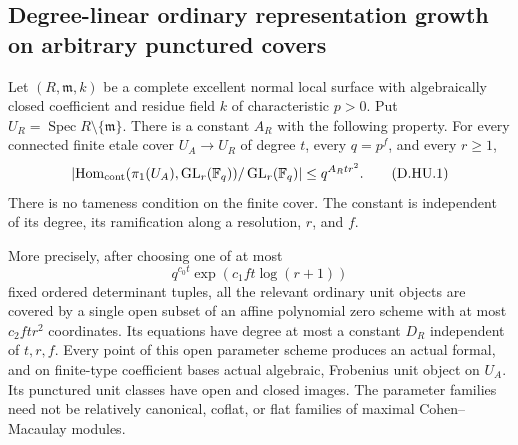 \subsection{Degree-linear ordinary representation growth on arbitrary punctured covers}

\begin{theorem}
\label{D:arbitrary-cover-ordinary-hereditary-growth}
Let $(R,\mathfrak m,k)$ be a complete excellent normal local
surface with algebraically closed coefficient and residue field
$k$ of characteristic $p>0$. Put
$U_R=\operatorname{Spec}R\setminus\{\mathfrak m\}$.
There is a constant $A_R$ with the following property.
For every connected finite etale cover $U_A\to U_R$ of
degree $t$, every $q=p^f$, and every $r\ge1$,
\[
 \left|\operatorname{Hom}_{\rm cont}
       (\pi_1(U_A),\operatorname{GL}_r(\mathbb F_q))
          /\operatorname{GL}_r(\mathbb F_q)\right|
                         \le q^{A_Rtr^2}.                \tag{D.HU.1}
\]
There is no tameness condition on the finite cover.
The constant is independent of its degree, its ramification
along a resolution, $r$, and $f$.

More precisely, after choosing one of at most
\[
              q^{c_0t}\exp(c_1ft\log(r+1))               \tag{D.HU.2}
\]
fixed ordered determinant tuples, all the relevant ordinary
unit objects are covered by a single open subset of an affine
polynomial zero scheme with at most $c_2ftr^2$ coordinates.
Its equations have degree at most a constant $D_R$ independent
of $t,r,f$. Every point of this open parameter scheme produces
an actual formal, and on finite-type coefficient bases actual
algebraic, Frobenius unit object on $U_A$.
Its punctured unit classes have open and closed images.
The parameter families need not be relatively canonical,
coflat, or flat families of maximal Cohen--Macaulay modules.
\end{theorem}

